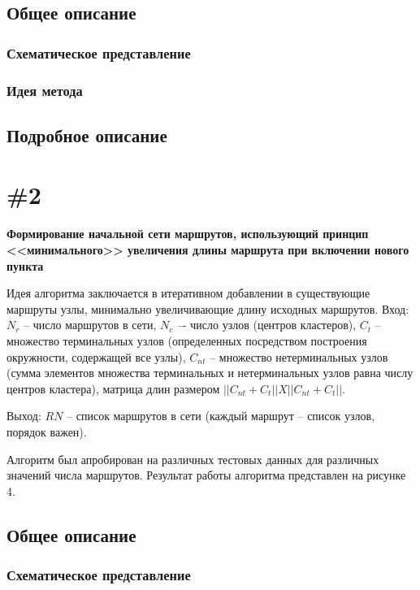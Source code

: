 \subsection{Общее описание}
\subsubsection{Схематическое представление}
\subsubsection{Идея метода}
\subsection{Подробное описание}

\section{\#2}

\textbf{Формирование начальной сети маршрутов, использующий принцип <<минимального>> увеличения длины 
маршрута при включении нового пункта}

Идея алгоритма заключается в итеративном добавлении в существующие маршруты узлы, минимально увеличивающие 
длину исходных маршрутов. Вход: \( N_r \) -- число маршрутов в сети, \( N_c \) –- число узлов 
(центров кластеров), \( C_t \) – множество терминальных узлов (определенных посредством построения 
окружности, содержащей все узлы), \( C_{nt} \) – множество нетерминальных узлов (сумма элементов множества 
терминальных и нетерминальных узлов равна числу центров кластера), матрица длин размером 
\( ||{C_{nt}} + {C_{t}}|| X ||{C_{nt}} + {C_{t}}|| \).

Выход: \( RN \) – список маршрутов в сети (каждый маршрут -- список узлов, порядок важен).  

Алгоритм был апробирован на различных тестовых данных для различных значений числа маршрутов. 
Результат работы алгоритма представлен на рисунке 4.

\subsection{Общее описание}
\subsubsection{Схематическое представление}
